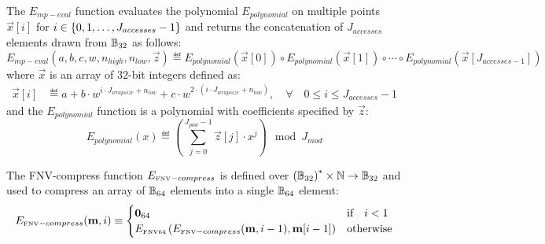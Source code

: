 The $E_{mp-eval}$ function evaluates the polynomial $E_{polynomial}$ on multiple points $\vec{x}[i]$ for $i\in {\left \{{0,1,\dots, J_{accesses}-1} \right \}}$ and returns the concatenation of $J_{accesses}$ elements drawn from $\mathbb{B}_{32}$ as follows:
\begin{equation}
	E_{mp-eval}(a,b,c,w,n_{high},n_{low},\vec{z}) \eqdef 
	E_{polynomial}\left(\vec{x}[0]\right) \circ E_{polynomial}\left(\vec{x}[1]\right) \circ \cdots \circ
	E_{polynomial}\left(\vec{x}[J_{accesses-1}]\right)
\end{equation}
where $\vec{x}$ is an array of $32$-bit integers defined as:
\begin{align}
	\vec{x}[i] &\eqdef a+b\cdot w^{i\cdot J_{wrapsize} + n_{low}} + c\cdot w^{2\cdot (i\cdot J_{wrapsize} + n_{low})}, \quad \forall \quad 0\le i \le J_{accesses}-1 
\end{align}
and the $E_{polynomial}$ function is a polynomial with coefficients specified by $\vec{z}$:
\begin{equation}
	E_{polynomial}(x) \eqdef \left(\sum_{j=0}^{J_{pow}-1} \vec{z}[j]\cdot x^j\right) \mod J_{mod}
\end{equation}

The FNV-compress function $E_{\text{\tiny FNV}-compress}$ is defined over $\left(\mathbb{B}_{32}\right)^* \times \mathbb{N} \to \mathbb{B}_{32}$ 
and used to compress an array of $\mathbb{B}_{64}$ elements into a single $\mathbb{B}_{64}$ element:
\begin{equation}
	E_{\text{\tiny FNV}-compress}(\mathbf{m},i) \equiv 
	\begin{cases}
		\mathbf{0}_{64} & \text{if} \quad i < 1 \\
		E_\text{\tiny FNV64}\left( 
		E_{\text{\tiny FNV}-compress}(\mathbf{m},i-1) ,
		\mathbf{m}[i-1]\right)
		& \text{otherwise}
	\end{cases}
\end{equation}
